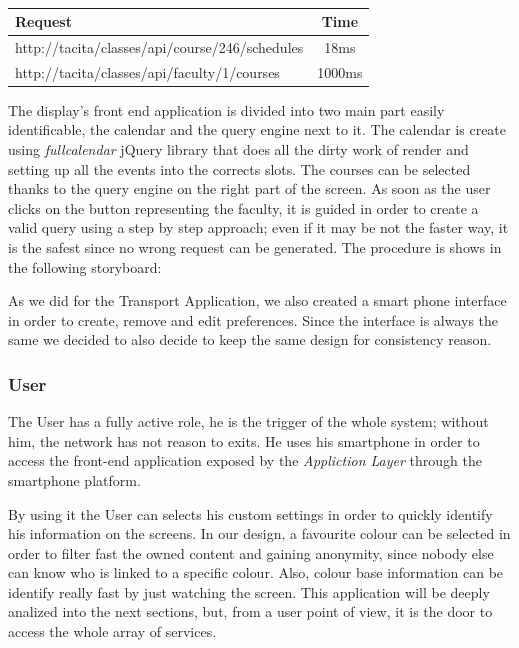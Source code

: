 \documentclass[]{usiinfbachelorproject}
\begin{document}
\begin{table}[h]
\centering
\begin{tabular}{|l|c|}
\hline
Request & Time \\\hline
http://tacita/classes/api/course/246/schedules & 18ms \\
http://tacita/classes/api/faculty/1/courses & 1000ms\\\hline
\end{tabular}
\caption[Table caption text]{}
\label{table:classes_request}
\end{table}
The display's front end application is divided into two main part easily identificable, the calendar and the query engine next to it. The calendar is create using \emph{fullcalendar} jQuery library that does all the dirty work of render and setting up all the events into the corrects slots. 
The courses can be selected thanks to the query engine on the right part of the screen. As soon as the user clicks on the button representing the faculty, it is guided in order to create a valid query using a step by step approach; even if it may be not the faster way, it is the safest since no wrong request can be generated. The procedure is shows in the following storyboard:

As we did for the Transport Application, we also created a smart phone interface in order to create, remove and edit preferences. Since the interface is always the same we decided to also decide to keep the same design for consistency reason.
\subsubsection{User}

The User has a fully active role, he is the trigger of the whole system; without him, the network has not reason to exits. He uses his smartphone in order to access the front-end application exposed by the \emph{Appliction Layer} through the smartphone platform.

By using it the User can selects his custom settings in order to quickly identify his information on the screens.
In our design, a favourite colour can be selected in order to filter fast the owned content and gaining anonymity, since nobody else can know who is linked to a specific colour. Also, colour base information can be identify really fast by just watching the screen.
This application will be deeply analized into the next sections, but, from a user point of view, it is the door to access the whole array of services.
\end{document}
